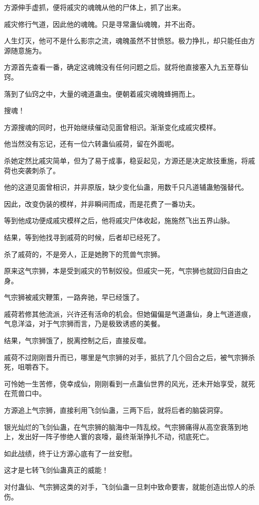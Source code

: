 \begin{this_body}
方源伸手虚抓，便将戚灾的魂魄从他的尸体上，抓了出来。

戚灾修行气道，因此他的魂魄。只是寻常蛊仙魂魄，并不出奇。

人生灯灭，他可不是什么影宗之流，魂魄虽然不甘愤怒。极力挣扎，却只能任由方源随意施为。

方源首先查看一番，确定这魂魄没有任何问题之后。就将他直接塞入九五至尊仙窍。

落到了仙窍之中，大量的魂道蛊虫。便朝着戚灾魂魄蜂拥而上。

搜魂！

方源搜魂的同时，也开始继续催动见面曾相识。渐渐变化成戚灾模样。

他当然没有忘记，还有一位六转蛊仙戚荷，留在外面呢。

杀她定然比戚灾简单，但为了易于成事，稳妥起见，方源还是决定故技重施，将戚荷也突袭刺杀了。

他的这道见面曾相识，并非原版，缺少变化仙蛊，用数千只凡道辅蛊勉强替代。

因此，改变伪装的模样，并非瞬间而成，而是花费了一番功夫。

等到他成功便成戚灾模样之后，他将戚灾尸体收起，施施然飞出五界山脉。

结果，等到他找寻到戚荷的时候，后者却已经死了。

杀了戚荷的，不是旁人，正是她胯下的荒兽气宗狮。

原来这气宗狮，本是受到戚灾的节制奴役。但戚灾一死，气宗狮也就回归自由之身。

气宗狮被戚灾鞭策，一路奔驰，早已经饿了。

戚荷若修其他流派，兴许还有活命的机会。但她偏偏是气道蛊仙，身上气道道痕，气息洋溢，对于气宗狮而言，乃是极致诱惑的美餐。

结果，气宗狮饿了，脱离控制之后，直接反噬。

戚荷不过刚刚晋升而已，哪里是气宗狮的对手，抵抗了几个回合之后，被气宗狮杀死，咀嚼吞下。

可怜她一生苦修，侥幸成仙，刚刚看到一点蛊仙世界的风光，还未开始享受，就死在荒兽口中。

方源追上气宗狮，直接利用飞剑仙蛊，三两下后，就将后者的脑袋洞穿。

银光灿烂的飞剑仙蛊，在气宗狮的脑海中一阵乱绞。气宗狮痛得从高空衰落到地上，发出好一阵子惨绝人寰的哀嚎，最终渐渐挣扎不动，彻底死亡。

如此战绩，终于让方源心底有了一丝安慰。

这才是七转飞剑仙蛊真正的威能！

对付蛊仙、气宗狮这类的对手，飞剑仙蛊一旦刺中致命要害，就能创造出惊人的杀伤。


\end{this_body}
